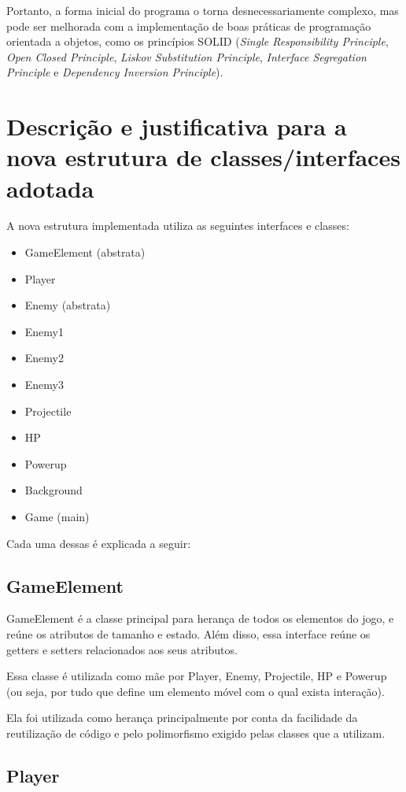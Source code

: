 \documentclass[
	12pt,				%
	oneside,			%
	a4paper,			%
	english,			%
	brazil				%
	]{abntex2ppgsi}
\begin{document}
Portanto, a forma inicial do programa o torna desnecessariamente complexo, mas pode ser melhorada com a implementação de boas práticas de programação orientada a objetos, como os princípios SOLID (\textit{Single Responsibility Principle}, \textit{Open Closed Principle}, \textit{Liskov Substitution Principle}, \textit{Interface Segregation Principle} e \textit{Dependency Inversion Principle}).

\chapter{Descrição e justificativa para a nova estrutura de classes/interfaces adotada}

A nova estrutura implementada utiliza as seguintes interfaces e classes:

\begin{itemize}
    \item GameElement (abstrata)
    \item Player
    \item Enemy (abstrata)
    \item Enemy1
    \item Enemy2
    \item Enemy3
    \item Projectile
    \item HP
    \item Powerup
    \item Background
    \item Game (main)
\end{itemize}

Cada uma dessas é explicada a seguir:

\section{GameElement}

GameElement é a classe principal para herança de todos os elementos do jogo, e reúne os atributos de tamanho e estado. Além disso, essa interface reúne os getters e setters relacionados aos seus atributos.

Essa classe é utilizada como mãe por Player, Enemy, Projectile, HP e Powerup (ou seja, por tudo que define um elemento móvel com o qual exista interação).

Ela foi utilizada como herança principalmente por conta da facilidade da reutilização de código e pelo polimorfismo exigido pelas classes que a utilizam.

\section{Player}
\end{document}
